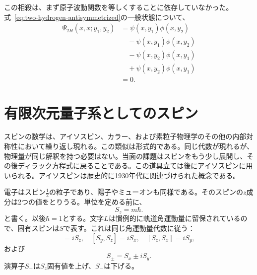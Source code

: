 \begin{classroomqa}
\end{classroomqa}

この相殺は、まず原子波動関数を等しくすることに依存していなかった。式~\eqref{eq:two-hydrogen-antisymmetrized}の一般状態について、
\begin{align}
\Psi_{2H}(x,x;y_1,y_2)
&=\psi(x,y_1)\phi(x,y_2)\nonumber\\
&\quad{}-\psi(x,y_1)\phi(x,y_2)\nonumber\\
&\quad{}-\psi(x,y_2)\phi(x,y_1)\nonumber\\
&\quad{}+\psi(x,y_2)\phi(x,y_1)\\
&=0.
\end{align}

\begin{classroomqa}
\end{classroomqa}

\section{有限次元量子系としてのスピン}

スピンの数学は、アイソスピン、カラー、および素粒子物理学のその他の内部対称性において繰り返し現れる。この類似は形式的である。同じ代数が現れるが、物理量が同じ解釈を持つ必要はない。当面の課題はスピンをもう少し展開し、その後ディラック方程式に戻ることである。この道具立ては後にアイソスピンに用いられる。アイソスピンは歴史的に1930年代に関連づけられた概念である。

電子はスピン\(\tfrac12\)の粒子であり、陽子やミューオンも同様である。そのスピンの\(z\)成分は2つの値をとりうる。単位を定める前に、
\begin{equation}
S_z=m\hbar.
\end{equation}
と書く。以後\(\hbar=1\)とする。文字\(L\)は慣例的に軌道角運動量に留保されているので、固有スピンは\(S\)で表す。これは同じ角運動量代数に従う：
\begin{equation}
[S_x,S_y]=iS_z,
\quad
[S_y,S_z]=iS_x,
\quad
[S_z,S_x]=iS_y,
\end{equation}
および
\begin{equation}
S_\pm=S_x\pm iS_y.
\end{equation}
演算子\(S_+\)は\(S_z\)固有値を上げ、\(S_-\)は下げる。

